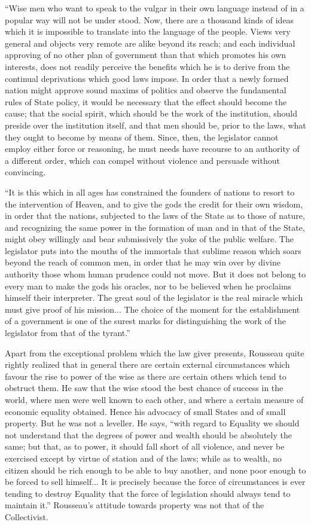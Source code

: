 \documentclass{book}
\begin{document}
“Wise men who want to speak to the vulgar in their own language instead of in a popular way will not be under stood. Now, there are a thousand kinds of ideas which it is impossible to translate into the language of the people. Views very general and objects very remote are alike beyond its reach; and each individual approving of no other plan of government than that which promotes his own interests, does not readily perceive the benefits which he is to derive from the continual deprivations which good laws impose. In order that a newly formed nation might approve sound maxims of politics and observe the fundamental rules of State policy, it would be necessary that the effect should become the cause; that the social spirit, which should be the work of the institution, should preside over the institution itself, and that men should be, prior to the laws, what they ought to become by means of them. Since, then, the legislator cannot employ either force or reasoning, he must needs have recourse to an authority of a different order, which can compel without violence and persuade without convincing.

“It is this which in all ages has constrained the founders of nations to resort to the intervention of Heaven, and to give the gods the credit for their own wisdom, in order that the nations, subjected to the laws of the State as to those of nature, and recognizing the same power in the formation of man and in that of the State, might obey willingly and bear submissively the yoke of the public welfare. The legislator puts into the mouths of the immortals that sublime reason which soars beyond the reach of common men, in order that he may win over by divine authority those whom human prudence could not move. But it does not belong to every man to make the gods his oracles, nor to be believed when he proclaims himself their interpreter. The great soul of the legislator is the real miracle which must give proof of his mission... The choice of the moment for the establishment of a government is one of the surest marks for distinguishing the work of the legislator from that of the tyrant.”

Apart from the exceptional problem which the law giver presents, Rousseau quite rightly realized that in general there are certain external circumstances which favour the rise to power of the wise as there are certain others which tend to obstruct them. He saw that the wise stood the best chance of success in the world, where men were well known to each other, and where a certain measure of economic equality obtained. Hence his advocacy of small States and of small property. But he was not a leveller. He says, “with regard to Equality we should not understand that the degrees of power and wealth should be absolutely the same; but that, as to power, it should fall short of all violence, and never be exercised except by virtue of station and of the laws; while as to wealth, no citizen should be rich enough to be able to buy another, and none poor enough to be forced to sell himself... It is precisely because the force of circumstances is ever tending to destroy Equality that the force of legislation should always tend to maintain it.” Rousseau’s attitude towards property was not that of the Collectivist.
\end{document}
